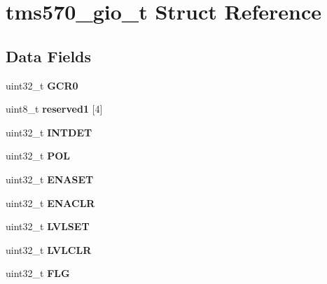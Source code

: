 \hypertarget{structtms570__gio__t}{}\section{tms570\+\_\+gio\+\_\+t Struct Reference}
\label{structtms570__gio__t}
\subsection*{Data Fields}
\begin{DoxyCompactItemize}
\item 
\mbox{\label{structtms570__gio__t_a262e04193710766bb7f0de7289c7061b}} 
uint32\+\_\+t {\bfseries G\+C\+R0}
\item 
\mbox{\label{structtms570__gio__t_a65d67e597e736f43c654b0deac11e4e3}} 
uint8\+\_\+t {\bfseries reserved1} \mbox{[}4\mbox{]}
\item 
\mbox{\label{structtms570__gio__t_a5ee781b5efba64762999e50b2de67b25}} 
uint32\+\_\+t {\bfseries I\+N\+T\+D\+ET}
\item 
\mbox{\label{structtms570__gio__t_a7789a664d1426c815c5490ebf94386b6}} 
uint32\+\_\+t {\bfseries P\+OL}
\item 
\mbox{\label{structtms570__gio__t_a133d8ab7ebbcb2ab57a065144dd4f1ab}} 
uint32\+\_\+t {\bfseries E\+N\+A\+S\+ET}
\item 
\mbox{\label{structtms570__gio__t_ac3bf647ca8a1e9ede3456e61a0098872}} 
uint32\+\_\+t {\bfseries E\+N\+A\+C\+LR}
\item 
\mbox{\label{structtms570__gio__t_ad48838f1d2dd5f4a9af467d224116654}} 
uint32\+\_\+t {\bfseries L\+V\+L\+S\+ET}
\item 
\mbox{\label{structtms570__gio__t_ab63266dbaefbad9c5302b7a7335a8870}} 
uint32\+\_\+t {\bfseries L\+V\+L\+C\+LR}
\item 
\mbox{\label{structtms570__gio__t_a0ea104fd1fc6ec49d2e3c28374618559}} 
uint32\+\_\+t {\bfseries F\+LG}
\item 

\end{DoxyCompactItemize}
